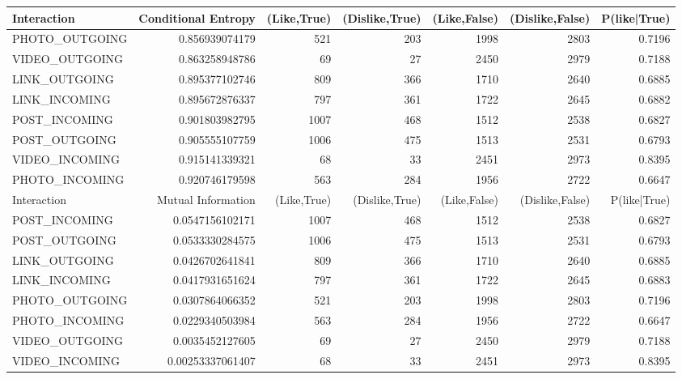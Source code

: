 \begin{table}
\begin{tabular}{| >{\small}l | >{\small}r | >{\small}r | >{\small}r | >{\small}r | >{\small}r | >{\small}r |}
		Interaction & Conditional Entropy & (Like,True) & (Dislike,True) & (Like,False) & (Dislike,False)  & P(like|True)\\
		\hline
		PHOTO\_OUTGOING & 0.856939074179 & 521 & 203 & 1998 & 2803 & 0.7196\\
		VIDEO\_OUTGOING & 0.863258948786 & 69 & 27 & 2450 & 2979 & 0.7188\\
		LINK\_OUTGOING & 0.895377102746 & 809 & 366 & 1710 & 2640 & 0.6885\\
		LINK\_INCOMING & 0.895672876337 & 797 & 361 & 1722 & 2645 & 0.6882\\
		POST\_INCOMING & 0.901803982795 & 1007 & 468 & 1512 & 2538 & 0.6827\\
		POST\_OUTGOING & 0.905555107759 & 1006 & 475 & 1513 & 2531 & 0.6793\\
		VIDEO\_INCOMING & 0.915141339321 & 68 & 33 & 2451 & 2973 & 0.8395\\
		PHOTO\_INCOMING & 0.920746179598 & 563 & 284 & 1956 & 2722 & 0.6647\\
		\hline
		\hline
		Interaction & Mutual Information & (Like,True) & (Dislike,True) & (Like,False) & (Dislike,False)& P(like|True)\\
		\hline
		POST\_INCOMING & 0.0547156102171 & 1007 & 468 & 1512 & 2538 & 0.6827\\
		POST\_OUTGOING & 0.0533330284575 & 1006 & 475 & 1513 & 2531  & 0.6793\\
		LINK\_OUTGOING & 0.0426702641841 & 809 & 366 & 1710 & 2640 & 0.6885\\
		LINK\_INCOMING & 0.0417931651624 & 797 & 361 & 1722 & 2645 & 0.6883\\
		PHOTO\_OUTGOING & 0.0307864066352 & 521 & 203 & 1998 & 2803 & 0.7196\\
		PHOTO\_INCOMING & 0.0229340503984 & 563 & 284 & 1956 & 2722 & 0.6647\\
		VIDEO\_OUTGOING & 0.0035452127605 & 69 & 27 & 2450 & 2979 & 0.7188\\
		VIDEO\_INCOMING & 0.00253337061407 & 68 & 33 & 2451 & 2973 & 0.8395\\
		\hline
				
	\end{tabular}
\end{table}

